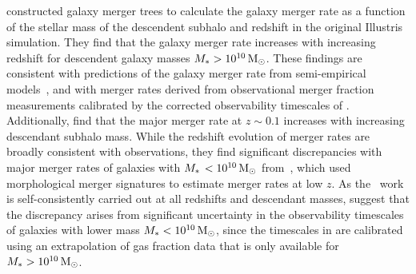 \documentclass[twocolumn,linenumbers]{aastex631}
\begin{document}
           

            
            \citet{RG2015} constructed galaxy merger trees to calculate the galaxy merger rate as a function of the stellar mass of the descendent subhalo and redshift in the original Illustris simulation. 
            They find that the galaxy merger rate increases with increasing redshift for descendent galaxy masses $M_{*{}}>10^{10}\,\mathrm{M}_\odot$. 
            These findings are consistent with predictions of the galaxy merger rate from semi-empirical models~\citep{Stewart2009,Hopkins2010a}, and with merger rates derived from observational merger fraction measurements calibrated by the corrected observability timescales of \citet{Lotz2011}.
            Additionally, \citet{RG2015} find that the major merger rate at $z\sim0.1$ increases with increasing descendant subhalo mass.
            While the redshift evolution of merger rates are broadly consistent with observations, they find significant discrepancies with major merger rates of galaxies with $M_{*{\,}} <10^{10}\,\mathrm{M}_\odot$ from~\citet{Casteels2014}, which used morphological merger signatures to estimate merger rates at low $z$. 
            As the~\citet{RG2015} work is self-consistently carried out at all redshifts and descendant masses, \citet{RG2015} suggest that the discrepancy arises from significant uncertainty in the observability timescales of galaxies with lower mass $M_{*{}}<10^{10}\,\mathrm{M}_\odot$, since the timescales in \citet{Casteels2014} are calibrated using an extrapolation of gas fraction data that is only available for $M_{*{}}>10^{10}\,\mathrm{M}_\odot$. 
            
\end{document}

